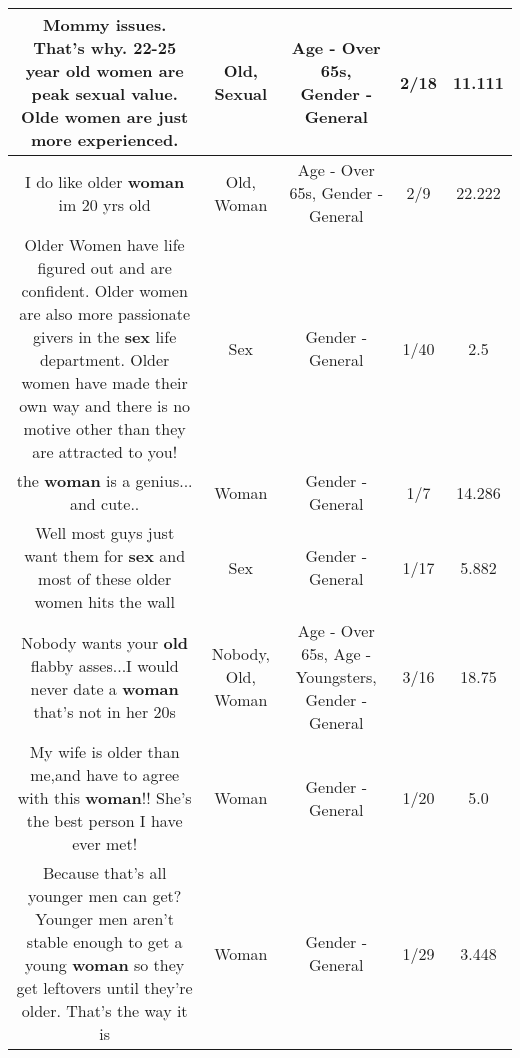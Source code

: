 \documentclass[11pt]{article}
\newlength\mylength
\begin{document}
\begin{center}
\begin{longtable}{|C{.65\mylength}|C{.30\mylength}|C{.12\mylength}|C{.12\mylength}|C{.12\mylength}|}
  \small Mommy issues. That's why. 22-25 year \textbf{old} women are peak \textbf{sexual} value. Olde women are just more experienced.\normalsize   & Old, Sexual & Age - Over 65s, Gender - General & 2/18 & 11.111 \\  \hline
  \small I do like older \textbf{woman} im 20 yrs old\normalsize   & Old, Woman & Age - Over 65s, Gender - General & 2/9 & 22.222 \\  \hline
  \small Older Women have life figured out and are confident. Older women are also more passionate givers in the \textbf{sex} life department. Older women have made their own way and there is no motive other than they are attracted to you!\normalsize   & Sex & Gender - General & 1/40 & 2.5 \\  \hline
  \small the \textbf{woman} is a genius... and cute..\normalsize   & Woman & Gender - General & 1/7 & 14.286 \\  \hline
  \small Well most guys just want them for \textbf{sex} and most of these older women hits the wall\normalsize   & Sex & Gender - General & 1/17 & 5.882 \\  \hline
  \small Nobody wants your \textbf{old} flabby asses...I would never date a \textbf{woman} that's not in her 20s\normalsize   & Nobody, Old, Woman & Age - Over 65s, Age - Youngsters, Gender - General & 3/16 & 18.75 \\  \hline
  \small My wife is older than me,and have to agree with this \textbf{woman}!! She's the best person I have ever met!\normalsize   & Woman & Gender - General & 1/20 & 5.0 \\  \hline
  \small Because that's all younger men can get? Younger men aren't stable enough to get a young \textbf{woman} so they get leftovers until they're older. That's the way it is\normalsize   & Woman & Gender - General & 1/29 & 3.448 \\  \hline

\end{longtable}
\end{center}
\end{document}
